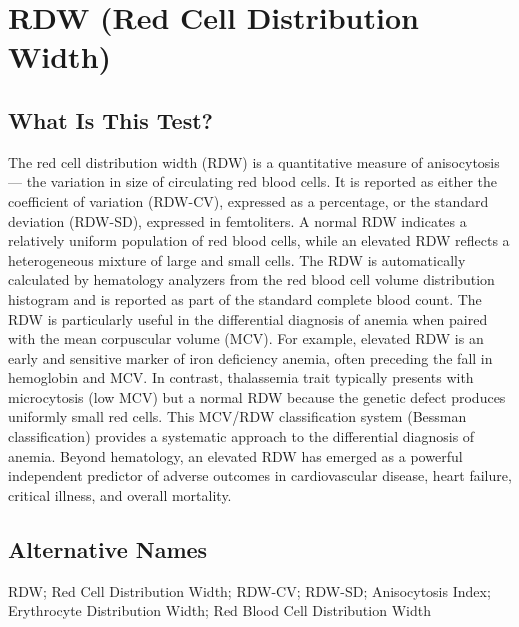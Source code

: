 \chapter{RDW (Red Cell Distribution Width)}

\section*{What Is This Test?}
The red cell distribution width (RDW) is a quantitative measure of anisocytosis --- the variation in size of circulating red blood cells. It is reported as either the coefficient of variation (RDW-CV), expressed as a percentage, or the standard deviation (RDW-SD), expressed in femtoliters. A normal RDW indicates a relatively uniform population of red blood cells, while an elevated RDW reflects a heterogeneous mixture of large and small cells. The RDW is automatically calculated by hematology analyzers from the red blood cell volume distribution histogram and is reported as part of the standard complete blood count. The RDW is particularly useful in the differential diagnosis of anemia when paired with the mean corpuscular volume (MCV). For example, elevated RDW is an early and sensitive marker of iron deficiency anemia, often preceding the fall in hemoglobin and MCV. In contrast, thalassemia trait typically presents with microcytosis (low MCV) but a normal RDW because the genetic defect produces uniformly small red cells. This MCV/RDW classification system (Bessman classification) provides a systematic approach to the differential diagnosis of anemia. Beyond hematology, an elevated RDW has emerged as a powerful independent predictor of adverse outcomes in cardiovascular disease, heart failure, critical illness, and overall mortality.

\section*{Alternative Names}
RDW; Red Cell Distribution Width; RDW-CV; RDW-SD; Anisocytosis Index; Erythrocyte Distribution Width; Red Blood Cell Distribution Width

